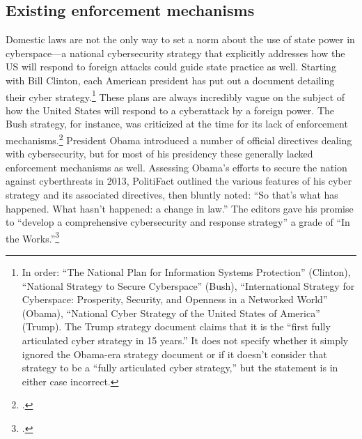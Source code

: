 \documentclass[11pt]{memoir}
\begin{document}
\begin{refsegment}
\subsection{Existing enforcement mechanisms}
Domestic laws are not the only way to set a norm about the use of state power in cyberspace---a national cybersecurity strategy that explicitly addresses how the US will respond to foreign attacks could guide state practice as well. Starting with Bill Clinton, each American president has put out a document detailing their cyber strategy.\footnote{In order: ``The National Plan for Information Systems Protection'' (Clinton), ``National Strategy to Secure Cyberspace'' (Bush), ``International Strategy for Cyberspace: Prosperity, Security, and Openness in a Networked World'' (Obama), ``National Cyber Strategy of the United States of America'' (Trump). The Trump strategy document claims that it is the ``first fully articulated cyber strategy in 15 years.'' It does not specify whether it simply ignored the Obama-era strategy document or if it doesn't consider that strategy to be a ``fully articulated cyber strategy,'' but the statement is in either case incorrect.} These plans are always incredibly vague on the subject of how the United States will respond to a cyberattack by a foreign power. The Bush strategy, for instance, was criticized at the time for its lack of enforcement mechanisms.\footcite{lemos_bush_2003} President Obama introduced a number of official directives dealing with cybersecurity, but for most of his presidency these generally lacked enforcement mechanisms as well. Assessing Obama's efforts to secure the nation against cyberthreats in 2013, PolitiFact outlined the various features of his cyber strategy and its associated directives, then bluntly noted: ``So that's what has happened. What hasn't happened: a change in law.'' The editors gave his promise to ``develop a comprehensive cybersecurity and response strategy'' a grade of ``In the Works.''\footcite{moorhead_work_2013}



\end{refsegment}
\end{document}
